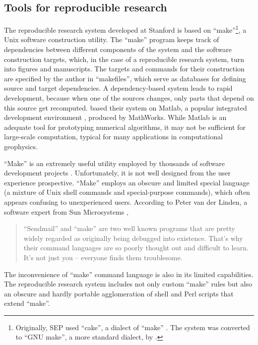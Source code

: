 \subsection{Tools for reproducible research}

The reproducible research system developed at Stanford is based on
``make''\footnote{Originally, SEP used ``cake'', a dialect of ``make''
  \cite[]{Nichols.sep.61.341,Claerbout.sep.67.145,Claerbout.sep.73.451,Claerbout.sep.77.427}.
  The system was converted to ``GNU make'', a more standard dialect,
  by \cite{Schwab.sep.89.217}.}, a Unix software construction utility.
The ``make'' program keeps track of dependencies between different
components of the system and the software construction targets, which,
in the case of a reproducible research system, turn into figures and
manuscripts. The targets and commands for their construction are
specified by the author in ``makefiles'', which serve as databases for
defining source and target dependencies. A dependency-based system
leads to rapid development, because when one of the sources changes,
only parts that depend on this source get recomputed.  \cite{donoho}
based their system on Matlab, a popular integrated development
environment \cite[]{matlab}, produced by MathWorks.  While Matlab is
an adequate tool for prototyping numerical algorithms, it may not be
sufficient for large-scale computation, typical for many applications
in computational geophysics.

``Make'' is an extremely useful utility employed by thousands of
software development projects \cite[]{make}. Unfortunately, it is not
well designed from the user experience prospective. ``Make'' employs
an obscure and limited special language (a mixture of Unix shell
commands and special-purpose commands), which often appears confusing
to unexperienced users. According to Peter van der Linden, a software
expert from Sun Microsystems \cite[]{linden},
\begin{quote}
  ``Sendmail'' and ``make'' are two well known programs that are
  pretty widely regarded as originally being debugged into existence.
  That's why their command languages are so poorly thought out and
  difficult to learn. It's not just you -- everyone finds them
  troublesome.
\end{quote}
The inconvenience of ``make'' command language is also in its limited
capabilities.  The reproducible research system includes not only
custom ``make'' rules but also an obscure and hardly portable
agglomeration of shell and Perl scripts that extend ``make''.

